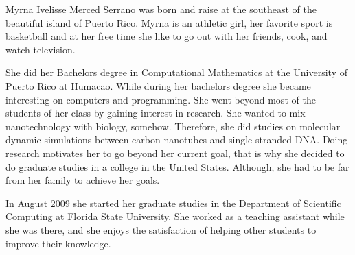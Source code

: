 \documentclass[11pt]{fsuthesis}
\begin{document}
%




\begin{biosketch}
Myrna Ivelisse Merced Serrano was born and raise at the southeast of the beautiful island of Puerto Rico. Myrna is an athletic girl, her favorite sport is basketball and at her free time she like to go out with her friends, cook, and watch television. 

She did her Bachelors degree in Computational Mathematics at the University of Puerto Rico at Humacao. While during her bachelors degree she became interesting on computers and programming. She went beyond most of the students of her class by gaining interest in research. She wanted to mix nanotechnology with biology, somehow. Therefore, she did studies on molecular dynamic simulations between carbon nanotubes and single-stranded DNA. Doing research motivates her to go beyond her current goal, that is why she decided to do graduate studies in a college in the United States. Although, she had to be far from her family to achieve her goals.

In August 2009 she started her graduate studies in the Department of Scientific Computing at Florida State University. She worked as a teaching assistant while she was there, and she enjoys the satisfaction of helping other students to improve their knowledge.


\end{biosketch}
\end{document}
